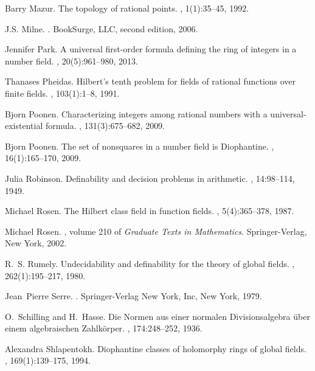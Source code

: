 \documentclass[12pt,reqno]{amsart}
\theoremstyle{definition}
\begin{document}
\begin{thebibliography}{CTVG15}
Barry Mazur.
\newblock The topology of rational points.
, 1(1):35--45, 1992.

J.S. Milne.
.
\newblock BookSurge, LLC, second edition, 2006.

Jennifer Park.
\newblock A universal first-order formula defining the ring of integers in a
  number field.
, 20(5):961--980, 2013.

Thanases Pheidas.
\newblock Hilbert's tenth problem for fields of rational functions over finite
  fields.
, 103(1):1--8, 1991.

Bjorn Poonen.
\newblock Characterizing integers among rational numbers with a
  universal-existential formula.
, 131(3):675--682, 2009.

Bjorn Poonen.
\newblock The set of nonsquares in a number field is {D}iophantine.
, 16(1):165--170, 2009.

Julia Robinson.
\newblock Definability and decision problems in arithmetic.
, 14:98--114, 1949.

Michael Rosen.
\newblock The {H}ilbert class field in function fields.
, 5(4):365--378, 1987.

Michael Rosen.
, volume 210 of {\em Graduate
  Texts in Mathematics}.
\newblock Springer-Verlag, New York, 2002.

R.~S. Rumely.
\newblock Undecidability and definability for the theory of global fields.
, 262(1):195--217, 1980.

Jean~Pierre Serre.
.
\newblock Springer-Verlag New York, Inc, New York, 1979.

O.~Schilling and H.~Hasse.
\newblock Die {N}ormen aus einer normalen {D}ivisionsalgebra \"uber einem
  algebraischen {Z}ahlk\"orper.
, 174:248--252, 1936.

Alexandra Shlapentokh.
\newblock Diophantine classes of holomorphy rings of global fields.
, 169(1):139--175, 1994.


\end{thebibliography}
\end{document}
